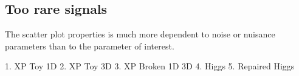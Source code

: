 \subsection{Too rare signals} %
\label{sub:too_rare_signals}



The scatter plot properties is much more dependent to noise or nuisance parameters than to the parameter of interest.







1. XP Toy 1D
2. XP Toy 3D
3. XP Broken 1D 3D
4. Higgs
5. Repaired Higgs



